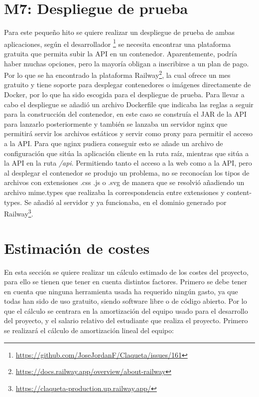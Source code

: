 \section{M7: Despliegue de prueba}

Para este pequeño hito se quiere realizar un despliegue de prueba de ambas aplicaciones, según el desarrollador 
\footnote{\url{https://github.com/JoseJordanF/Claqueta/issues/161}} se necesita encontrar una plataforma gratuita que 
permita subir la API en un contenedor\cite{BenefDocker}. Aparentemente, podría haber muchas opciones, pero la mayoría 
obligan a inscribirse a un plan de pago. Por lo que se ha encontrado la plataforma 
Railway\footnote{\url{https://docs.railway.app/overview/about-railway}}, la cual ofrece un mes gratuito y tiene soporte 
para desplegar contenedores o imágenes directamente de Docker, por lo que ha sido escogida para el despliegue de prueba.
Para llevar a cabo el despliegue se añadió un archivo Dockerfile que indicaba las reglas a seguir para la construcción
del contenedor, en este caso se construía el JAR de la API para lanzarlo posteriormente y también se lanzaba un servidor 
nginx que permitirá servir los archivos estáticos y servir como proxy\cite{WhatIsProxyS} para permitir el acceso a la 
API. Para que nginx\cite{WhatIsNginx} pudiera conseguir esto se añade un archivo de configuración que sitúa la 
aplicación cliente en la ruta raíz, mientras que sitúa a la API en la ruta \textit{/api}. Permitiendo tanto el acceso a 
la web como a la API, pero al desplegar el contenedor se produjo un problema, no se reconocían los tipos de archivos con 
extensiones .css .js o .svg de manera que se resolvió añadiendo un archivo mime.types que realizaba la correspondencia 
entre extensiones y content-types. Se añadió al servidor y ya funcionaba, en el dominio generado por Railway\footnote{\url{https://claqueta-production.up.railway.app/}}.

\section{Estimación de costes}

En esta sección se quiere realizar un cálculo estimado de los costes del proyecto, para ello se tienen que tener en 
cuenta distintos factores. Primero se debe tener en cuenta que ninguna herramienta usada ha requerido ningún gasto, ya 
que todas han sido de uso gratuito, siendo software libre o de código abierto. Por lo que el cálculo se centrara en la 
amortización del equipo usado para el desarrollo del proyecto, y el salario relativo del estudiante que realiza el 
proyecto. Primero se realizará el cálculo de amortización lineal del equipo\cite{CalcAmortizacion}:

